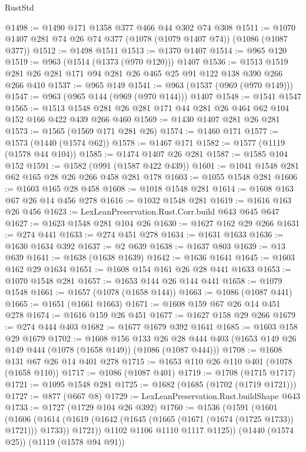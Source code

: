 \begin{lexlean}{RustStd}
\begin{coremodule}
@1498 := @1490 @171 @1358 @377 @466 @44 @302 @74 @308
@1511 := @1070 @1407 @281 @74 @26 @74 @377 (@1078 (@1079 @1407 @74)) (@1086 (@1087 @377))
@1512 := @1498 @1511
@1513 := @1370 @1407
@1514 := @965 @120
@1519 := @963 (@1514 (@1373 (@970 @120))) @1407
@1536 := @1513 @1519 @281 @26 @281 @171 @94 @281 @26 @465 @25 @91 @122 @138 @390 @266 @266 @410
@1537 := @965 @149
@1541 := @963 (@1537 (@969 (@970 @149)))
@1547 := @963 (@965 @144 (@969 (@970 @144))) @1407
@1548 := @1541 @1547
@1565 := @1513 @1548 @281 @26 @281 @171 @44 @281 @26 @464 @62 @104 @152 @166 @422 @439 @266 @460
@1569 := @1430 @1407 @281 @26 @281
@1573 := @1565 (@1569 @171 @281 @26)
@1574 := @1460 @171
@1577 := @1573 (@1440 (@1574 @62))
@1578 := @1467 @171
@1582 := @1577 (@1119 (@1578 @44 @104))
@1585 := @1474 @1407 @26 @281
@1587 := @1585 @104 @152
@1591 := @1582 (@991 (@1587 @422 @439))
@1601 := @1041 @1548 @281 @62 @165 @28 @26 @266 @458 @281 @178
@1603 := @1055 @1548 @281
@1606 := @1603 @165 @28 @458
@1608 := @1018 @1548 @281
@1614 := @1608 @163 @67 @26 @14 @456 @278
@1616 := @1032 @1548 @281
@1619 := @1616 @163 @26 @456
@1623 := LexLeanPreservation.Rust.Corr.build @643 @645 @647
@1627 := @1623 @1548 @281 @104 @26
@1630 := @1627 @162 @29 @266
@1631 := @274 @441
@1633 := @274 @451 @278
@1634 := @1631 @1633
@1636 := @1630 @1634 @392
@1637 := @2 @639
@1638 := @1637 @803
@1639 := @13 @639
@1641 := @1638 (@1638 @1639)
@1642 := @1636 @1641
@1645 := @1603 @162 @29 @1634
@1651 := @1608 @154 @161 @26 @28 @441 @1633
@1653 := @1070 @1548 @281
@1657 := @1653 @144 @26 @144 @441
@1658 := @1079 @1548
@1661 := @1657 (@1078 (@1658 @144))
@1663 := @1086 (@1087 @441)
@1665 := @1651 (@1661 @1663)
@1671 := @1608 @159 @67 @26 @14 @451 @278
@1674 := @1616 @159 @26 @451
@1677 := @1627 @158 @29 @266
@1679 := @274 @444 @403
@1682 := @1677 @1679 @392 @1641
@1685 := @1603 @158 @29 @1679
@1702 := @1608
    @156
    @133
    @26
    @28
    @444
    @403
    (@1653 @149 @26 @149 @444 (@1078 (@1658 @149)) (@1086 (@1087 @444)))
@1708 := @1608 @131 @67 @26 @14 @401 @278
@1715 := @1653 @110 @26 @110 @401 (@1078 (@1658 @110))
@1717 := @1086 (@1087 @401)
@1719 := @1708 (@1715 @1717)
@1721 := @1095 @1548 @281
@1725 := @1682 (@1685 (@1702 (@1719 @1721)))
@1727 := @877 (@667 @8)
@1729 := LexLeanPreservation.Rust.buildShape @643
@1733 := @1727 (@1729 @104 @26 @392)
@1760 := @1536
    (@1591
      (@1601
        (@1606
          (@1614 (@1619 (@1642 (@1645 (@1665 (@1671 (@1674 (@1725 @1733)) @1721))) @1733)) @1721))
        @1102
        @1106
        @1110
        @1117
        @1125))
    (@1440 (@1574 @25))
    (@1119 (@1578 @94 @91))

\end{coremodule}
\end{lexlean}
